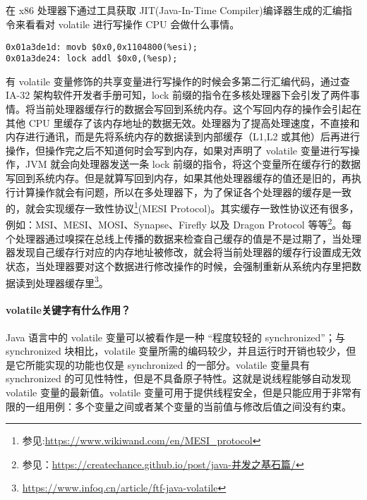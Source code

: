 \documentclass[../../../interview-questions.tex]{subfiles}
\begin{document}
\subsection{\color{red}{volatile的实现原理}}

在 x86 处理器下通过工具获取 JIT(Java-In-Time Compiler)编译器生成的汇编指令来看看对 volatile 进行写操作 CPU 会做什么事情。

\begin{lstlisting}
0x01a3de1d: movb $0x0,0x1104800(%esi);
0x01a3de24: lock addl $0x0,(%esp);
\end{lstlisting}

有 volatile 变量修饰的共享变量进行写操作的时候会多第二行汇编代码，通过查 IA-32 架构软件开发者手册可知，lock 前缀的指令在多核处理器下会引发了两件事情。将当前处理器缓存行的数据会写回到系统内存。这个写回内存的操作会引起在其他 CPU 里缓存了该内存地址的数据无效。处理器为了提高处理速度，不直接和内存进行通讯，而是先将系统内存的数据读到内部缓存（L1,L2 或其他）后再进行操作，但操作完之后不知道何时会写到内存，如果对声明了 volatile 变量进行写操作，JVM 就会向处理器发送一条 lock 前缀的指令，将这个变量所在缓存行的数据写回到系统内存。但是就算写回到内存，如果其他处理器缓存的值还是旧的，再执行计算操作就会有问题，所以在多处理器下，为了保证各个处理器的缓存是一致的，就会实现缓存一致性协议\footnote{参见:\url{https://www.wikiwand.com/en/MESI_protocol}}(MESI Protocol)。其实缓存一致性协议还有很多，例如：MSI、MESI、MOSI、Synapse、Firefly 以及 Dragon Protocol 等等\footnote{参见：\url{https://createchance.github.io/post/java-并发之基石篇/}}。每个处理器通过嗅探在总线上传播的数据来检查自己缓存的值是不是过期了，当处理器发现自己缓存行对应的内存地址被修改，就会将当前处理器的缓存行设置成无效状态，当处理器要对这个数据进行修改操作的时候，会强制重新从系统内存里把数据读到处理器缓存里\footnote{\url{https://www.infoq.cn/article/ftf-java-volatile}}。

\paragraph{volatile关键字有什么作用？}

Java 语言中的 volatile 变量可以被看作是一种 “程度较轻的 synchronized”；与 synchronized 块相比，volatile 变量所需的编码较少，并且运行时开销也较少，但是它所能实现的功能也仅是 synchronized 的一部分。volatile 变量具有 synchronized 的可见性特性，但是不具备原子特性。这就是说线程能够自动发现 volatile 变量的最新值。volatile 变量可用于提供线程安全，但是只能应用于非常有限的一组用例：多个变量之间或者某个变量的当前值与修改后值之间没有约束。
\end{document}
